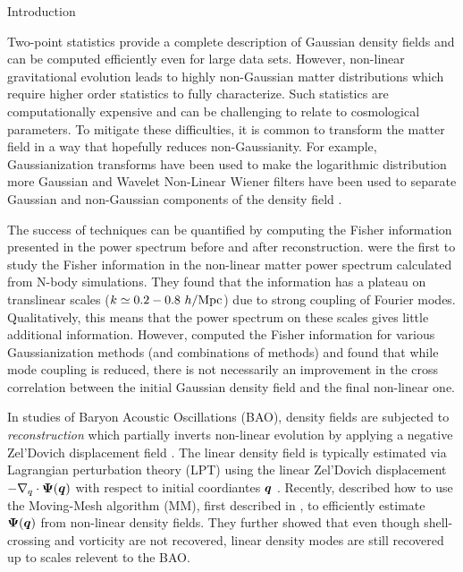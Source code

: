 \begin{section}{Introduction}\label{sec:introduction}  

  Two-point statistics provide a complete description of Gaussian
  density fields and can be computed efficiently even for large data
  sets.  However, non-linear gravitational evolution leads to highly
  non-Gaussian matter distributions which require higher order
  statistics to fully characterize.  Such statistics are
  computationally expensive and can be challenging to relate to
  cosmological parameters.  To mitigate these difficulties, it is
  common to transform the matter field in a way that hopefully reduces
  non-Gaussianity.  For example, Gaussianization transforms have been
  used to make the logarithmic distribution more Gaussian
  \cite{bib:Weinberg1992,bib:Mark2009} and Wavelet Non-Linear Wiener
  filters have been used to separate Gaussian and non-Gaussian
  components of the density field
  \cite{bib:Zhang2011,bib:Yu2012,bib:HarnoisD2013}.

  The success of techniques can be quantified by computing the Fisher
  information presented in the power spectrum before and after
  reconstruction.  \citet{bib:Rimes2006}
  were the first to study the Fisher information in the non-linear
  matter power spectrum calculated from N-body simulations.  They
  found that the information has a plateau on translinear scales
  ($k \simeq 0.2-0.8\ h/{\rm Mpc}$) due to strong coupling of Fourier
  modes.  Qualitatively, this means that the power spectrum on these
  scales gives little additional information.  
  However, \citet{bib:HarnoisD2013} computed the Fisher information
  for various Gaussianization methods (and combinations of methods)
  and found that while mode coupling is reduced, there is not
  necessarily an improvement in the cross correlation between the
  initial Gaussian density field and the final non-linear one. 

  In studies of Baryon Acoustic Oscillations (BAO), density fields are
  subjected to {\it reconstruction} which partially inverts non-linear
  evolution by applying a negative Zel'Dovich displacement field \cite{bib:Eisenstein2007}.
  The linear density field is
  typically estimated via Lagrangian perturbation theory (LPT)
  using the linear Zel'Dovich displacement $-\nabla_q\cdot\boldsymbol\Psi(\boldsymbol q)$
  with respect to initial coordiantes $\boldsymbol{q}$ \cite{bib:Zel1970}.
  Recently, \citet{bib:Zhu2016} described how to use the Moving-Mesh
  algorithm (MM), first described in \cite{bib:Pen1995,bib:Pen1998},
  to efficiently estimate $\boldsymbol{\Psi}(\boldsymbol{q})$ from non-linear
  density fields.  They further showed that even though shell-crossing
  and vorticity are not recovered, linear density modes are still 
  recovered up to scales relevent to the BAO.


\end{section}
